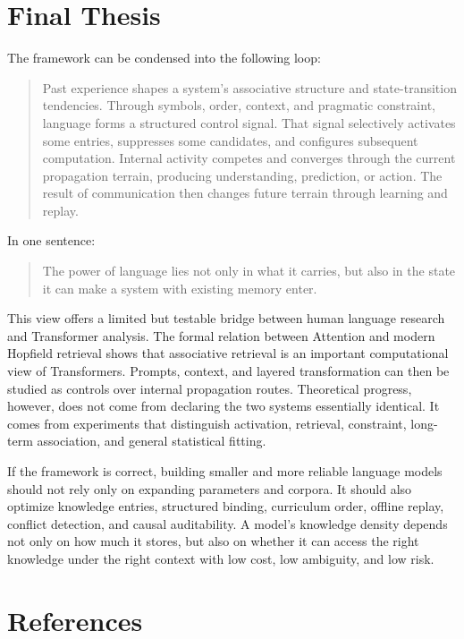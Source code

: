 \documentclass[11pt, a4paper]{article}
\begin{document}
\section{Final Thesis}


The framework can be condensed into the following loop:


\begin{quote}
Past experience shapes a system's associative structure and state-transition tendencies. Through symbols, order, context, and pragmatic constraint, language forms a structured control signal. That signal selectively activates some entries, suppresses some candidates, and configures subsequent computation. Internal activity competes and converges through the current propagation terrain, producing understanding, prediction, or action. The result of communication then changes future terrain through learning and replay.
\end{quote}


In one sentence:


\begin{quote}
The power of language lies not only in what it carries, but also in the state it can make a system with existing memory enter.
\end{quote}


This view offers a limited but testable bridge between human language research and Transformer analysis. The formal relation between Attention and modern Hopfield retrieval shows that associative retrieval is an important computational view of Transformers. Prompts, context, and layered transformation can then be studied as controls over internal propagation routes. Theoretical progress, however, does not come from declaring the two systems essentially identical. It comes from experiments that distinguish activation, retrieval, constraint, long-term association, and general statistical fitting.


If the framework is correct, building smaller and more reliable language models should not rely only on expanding parameters and corpora. It should also optimize knowledge entries, structured binding, curriculum order, offline replay, conflict detection, and causal auditability. A model's knowledge density depends not only on how much it stores, but also on whether it can access the right knowledge under the right context with low cost, low ambiguity, and low risk.



\section*{References}
\end{document}
